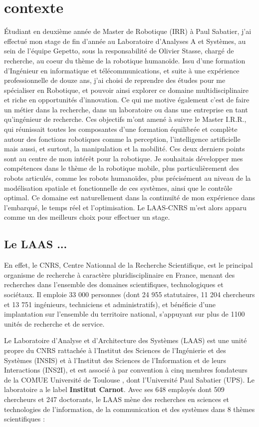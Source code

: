 \documentclass{report}
\begin{document}
\section*{contexte}

\'{E}tudiant en deuxième année de Master de Robotique (IRR) à Paul Sabatier, j'ai effectué mon stage de fin d'année au Laboratoire d'Analyses A et Systèmes, au sein de l'équipe Gepetto, sous la responsabilité de Olivier Stasse, chargé de recherche, au coeur du thème de la robotique humanoïde. Issu d'une formation d'Ingénieur en informatique et télécommunications, et suite à une expérience professionnelle de douze ans, j'ai choisi de reprendre des études pour me spécialiser en Robotique, et pouvoir ainsi explorer ce domaine multidisciplinaire et riche en opportunités d'innovation. Ce qui me motive également c'est de faire un métier dans la recherche, dans un laboratoire ou dans une entreprise en tant qu'ingénieur de recherche. Ces objectifs m'ont amené à suivre le Master I.R.R., qui réunissait toutes les composantes d'une formation équilibrée et complète autour des fonctions robotiques comme la perception, l'intelligence artificielle mais aussi, et surtout, la manipulation et la mobilité. Ces deux derniers points sont au centre de mon intérêt pour la robotique. Je souhaitais développer mes compétences dans le thème de la robotique mobile, plus particulièrement des robots articulés, comme les robots humanoïdes, plus précisément au niveau de la modélisation spatiale et fonctionnelle de ces systèmes, ainsi que le contrôle optimal. Ce domaine est naturellement dans la continuïté de mon expérience dans l'embarqué, le temps réel et l'optimisation. Le LAAS-CNRS m'est alors apparu comme un des meilleurs choix pour effectuer un stage.

\subsection*{Le LAAS ...}
En effet, le CNRS, Centre Nationnal de la Recherche Scientifique, est le principal organisme de recherche à caractère pluridisciplinaire en France, menant des recherches dans l'ensemble des domaines scientifiques, technologiques et sociétaux. Il emploie 33 000 personnes (dont 24 955 statutaires, 11 204 chercheurs et 13 751 ingénieurs, techniciens et administratifs), et bénéficie d'une implantation sur l'ensemble du territoire national, s'appuyant sur plus de 1100 unités de recherche et de service.

Le Laboratoire d’Analyse et d’Architecture des Systèmes (LAAS) est une unité propre du CNRS rattachée à l’Institut des Sciences de l'Ingénierie et des Systèmes (INSIS) et à l'Institut des Sciences de l'Information et de leurs Interactions (INS2I), et est associé à par convention à cinq membres fondateurs de la COMUE \og Université de Toulouse \fg{}, dont l'Université Paul Sabatier (UPS). Le laboratoire a le label \textbf{Institut Carnot}. Avec ses 648 employés dont 509 chercheurs et 247 doctorants, le LAAS mène des recherches en sciences et technologies de l’information, de la communication et des systèmes dans 8 thèmes scientifiques :
\end{document}

